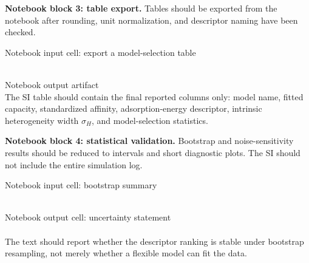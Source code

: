 \documentclass[journal=jacsat,manuscript=article]{achemso}
\begin{document}
\noindent\textbf{Notebook block 3: table export.}
Tables should be exported from the notebook after rounding, unit normalization,
and descriptor naming have been checked.

\begin{bluebox}{Notebook input cell: export a model-selection table}
\small
\noindent\texttt{}\\
\texttt{}\\
\texttt{}
\end{bluebox}

\begin{greenbox}{Notebook output artifact}
\small
\noindent\texttt{}\\
The SI table should contain the final reported columns only: model name, fitted
capacity, standardized affinity, adsorption-energy descriptor, intrinsic
heterogeneity width \(\sigma_H\), and model-selection statistics.
\end{greenbox}

\noindent\textbf{Notebook block 4: statistical validation.}
Bootstrap and noise-sensitivity results should be reduced to intervals and
short diagnostic plots. The SI should not include the entire simulation log.

\begin{bluebox}{Notebook input cell: bootstrap summary}
\small
\noindent\texttt{}\\
\texttt{}\\
\texttt{}
\end{bluebox}

\begin{greenbox}{Notebook output cell: uncertainty statement}
\small
\noindent\texttt{}\\
\texttt{}\\
The text should report whether the descriptor ranking is stable under bootstrap
resampling, not merely whether a flexible model can fit the data.
\end{greenbox}
\end{document}
